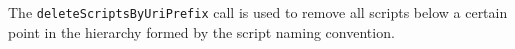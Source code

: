 The \verb+deleteScriptsByUriPrefix+ call is used to remove all scripts below a certain point
in the hierarchy formed by the script naming convention.
